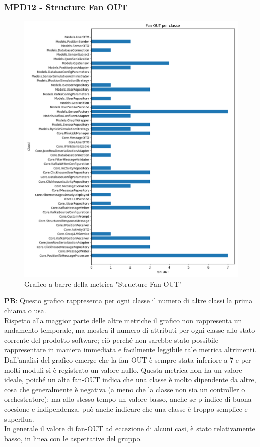 \documentclass[10pt]{article}
\begin{document}
\begin{justify}
\subsubsection{MPD12 - Structure Fan OUT}

\begin{figure}[H]
  \centering
  \includegraphics[width=0.9\linewidth]{metrics_fan_out.png}
  \caption{Grafico a barre della metrica "Structure Fan OUT"}
\end{figure}

\textbf{PB}: Questo grafico rappresenta per ogni classe il numero di altre classi la prima chiama o usa.\\
Rispetto alla maggior parte delle altre metriche il grafico non rappresenta un andamento temporale, ma mostra il numero di attributi per ogni classe allo stato 
corrente del prodotto software; ciò perché non sarebbe stato possibile rappresentare in maniera immediata e  facilmente leggibile tale metrica altrimenti.\\
Dall'analisi del grafico emerge che la fan-OUT è sempre stata inferiore a 7 e per molti moduli si è registrato un valore nullo. Questa metrica non ha un valore ideale,
poiché un alta fan-OUT indica che una classe è molto dipendente da altre, cosa che generalmente è negativa (a meno che la classe non sia un controller o orchestratore); 
ma allo stesso tempo un valore basso, anche se p indice di buona coesione e indipendenza, può anche indicare che una classe è troppo semplice e superflua.\\
In generale il valore di fan-OUT ad eccezione di alcuni casi, è stato relativamente basso, in linea con le aspettative del gruppo.\\



\end{justify}
\end{document}
